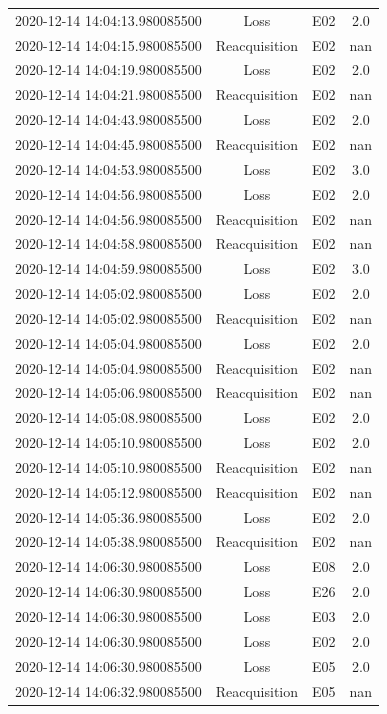 \begin{enumerate}
\begin{longtabu}{cccc}
2020{-}12{-}14 14:04:13.980085500&Loss&E02&2.0\\%
2020{-}12{-}14 14:04:15.980085500&Reacquisition&E02&nan\\%
2020{-}12{-}14 14:04:19.980085500&Loss&E02&2.0\\%
2020{-}12{-}14 14:04:21.980085500&Reacquisition&E02&nan\\%
2020{-}12{-}14 14:04:43.980085500&Loss&E02&2.0\\%
2020{-}12{-}14 14:04:45.980085500&Reacquisition&E02&nan\\%
2020{-}12{-}14 14:04:53.980085500&Loss&E02&3.0\\%
2020{-}12{-}14 14:04:56.980085500&Loss&E02&2.0\\%
2020{-}12{-}14 14:04:56.980085500&Reacquisition&E02&nan\\%
2020{-}12{-}14 14:04:58.980085500&Reacquisition&E02&nan\\%
2020{-}12{-}14 14:04:59.980085500&Loss&E02&3.0\\%
2020{-}12{-}14 14:05:02.980085500&Loss&E02&2.0\\%
2020{-}12{-}14 14:05:02.980085500&Reacquisition&E02&nan\\%
2020{-}12{-}14 14:05:04.980085500&Loss&E02&2.0\\%
2020{-}12{-}14 14:05:04.980085500&Reacquisition&E02&nan\\%
2020{-}12{-}14 14:05:06.980085500&Reacquisition&E02&nan\\%
2020{-}12{-}14 14:05:08.980085500&Loss&E02&2.0\\%
2020{-}12{-}14 14:05:10.980085500&Loss&E02&2.0\\%
2020{-}12{-}14 14:05:10.980085500&Reacquisition&E02&nan\\%
2020{-}12{-}14 14:05:12.980085500&Reacquisition&E02&nan\\%
2020{-}12{-}14 14:05:36.980085500&Loss&E02&2.0\\%
2020{-}12{-}14 14:05:38.980085500&Reacquisition&E02&nan\\%
2020{-}12{-}14 14:06:30.980085500&Loss&E08&2.0\\%
2020{-}12{-}14 14:06:30.980085500&Loss&E26&2.0\\%
2020{-}12{-}14 14:06:30.980085500&Loss&E03&2.0\\%
2020{-}12{-}14 14:06:30.980085500&Loss&E02&2.0\\%
2020{-}12{-}14 14:06:30.980085500&Loss&E05&2.0\\%
2020{-}12{-}14 14:06:32.980085500&Reacquisition&E05&nan\\%

\end{longtabu}
\end{enumerate}
